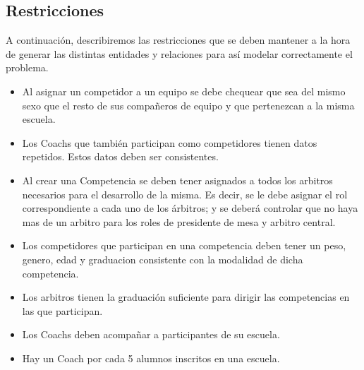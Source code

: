 \subsection{Restricciones}


A continuación, describiremos las restricciones que se deben mantener a la hora de generar las distintas entidades y relaciones para así modelar correctamente el problema.

\begin{itemize}
\item Al asignar un competidor a un equipo se debe chequear que sea del mismo sexo que el resto de sus compañeros de equipo y que pertenezcan a la misma escuela.
\item Los Coachs que también participan como competidores tienen datos repetidos. Estos datos deben ser consistentes.
\item Al crear una Competencia se deben tener asignados a todos los arbitros necesarios para el desarrollo de la misma. Es decir, se le debe asignar el rol correspondiente a cada uno de los árbitros; y se deberá controlar que no haya mas de un arbitro para los roles de presidente de mesa y arbitro central.
\item Los competidores que participan en una competencia deben tener un peso, genero, edad y graduacion consistente con la modalidad de dicha competencia.
\item Los arbitros tienen la graduación suficiente para dirigir las competencias en las que participan.
\item Los Coachs deben acompañar a participantes de su escuela.
\item Hay un Coach por cada 5 alumnos inscritos en una escuela.
\end{itemize}